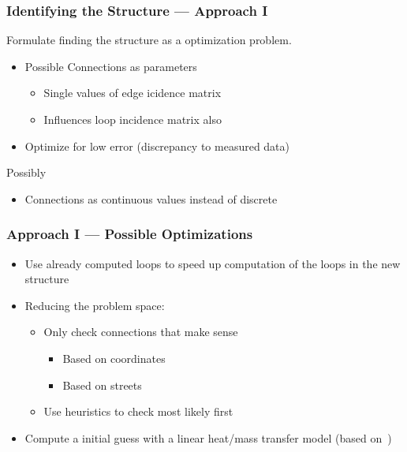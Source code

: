 \documentclass{beamer}
\begin{document}
\begin{frame}
\frametitle{Identifying the Structure --- Approach I}
  Formulate finding the structure as a optimization problem.

  \vspace{2em}

  \begin{itemize}
    \item Possible Connections as parameters
      \begin{itemize}
        \item Single values of edge icidence matrix
        \item Influences loop incidence matrix also
      \end{itemize}
    \item Optimize for low error (discrepancy to measured data)
  \end{itemize}

  \vspace{2em}

  Possibly
  \begin{itemize}
    \item Connections as continuous values instead of discrete
  \end{itemize}
\end{frame}

\begin{frame}
\frametitle{Approach I --- Possible Optimizations}
  \begin{itemize}
    \item Use already computed loops to speed up computation of the loops in the new structure
    \item Reducing the problem space:
    \begin{itemize}
      \item Only check connections that make sense
        \begin{itemize}
          \item Based on coordinates
          \item Based on streets
        \end{itemize}
      \item Use heuristics to check most likely first
    \end{itemize}
    \item Compute a initial guess with a linear heat/mass transfer model (based on~\cite{wang2024identification})
  \end{itemize}
\end{frame}
\end{document}
